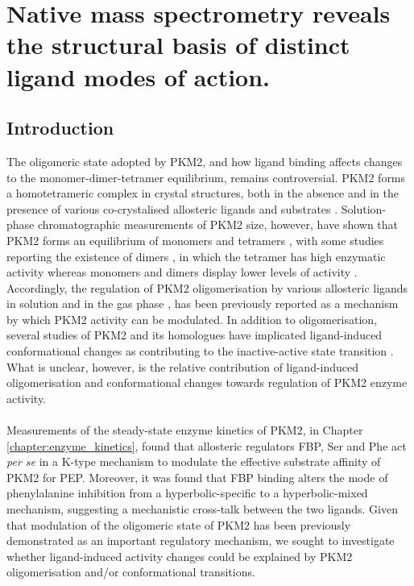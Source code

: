 \chapter{Native mass spectrometry reveals the structural basis of distinct ligand modes of action.}
\label{chapter:mass_spec}

\section{Introduction}
The oligomeric state adopted by PKM2, and how ligand binding affects changes to the monomer-dimer-tetramer equilibrium, remains controversial. PKM2 forms a homotetrameric complex in crystal structures, both in the absence and in the presence of various co-crystalised allosteric ligands and substrates \cite{Anastasiou:2012aa,Chaneton:2012aa,Christofk:2008aa,Dombrauckas:2005aa,Morgan:2013aa,Yuan:2018aa}. Solution-phase chromatographic measurements of PKM2 size, however, have shown that PKM2 forms an equilibrium of monomers and tetramers \cite{Anastasiou:2012aa,Hofmann:1975aa,Kato:1989aa,Morgan:2013aa,Yuan:2018aa}, with some studies reporting the existence of dimers \cite{Keller:2012aa,Yan:2016aa}, in which the tetramer has high enzymatic activity whereas monomers and dimers display lower levels of activity \cite{Anastasiou:2012aa,Ashizawa:1990aa,Ashizawa:1991aa,Hofmann:1975aa,Mazurek:2011aa}. Accordingly, the regulation of PKM2 oligomerisation by various allosteric ligands in solution \cite{Anastasiou:2012aa,Ashizawa:1990aa,Hofmann:1975aa,Keller:2012aa,Morgan:2013aa,Yan:2016aa,Yuan:2018aa} and in the gas phase \cite{Gavriilidou:2018aa}, has been previously reported as a mechanism by which PKM2 activity can be modulated. In addition to oligomerisation, several studies of PKM2 and its homologues have implicated ligand-induced conformational changes as contributing to the inactive-active state transition \cite{Dombrauckas:2005aa,Gehrig:2017aa,Morgan:2010aa,Morgan:2013aa,Morgan:2014aa,Naithani:2015aa,Yuan:2018aa,Zhong:2017aa}. What is unclear, however, is the relative contribution of ligand-induced oligomerisation and conformational changes towards regulation of PKM2 enzyme activity.  
%
%
\\\\
%
%
Measurements of the steady-state enzyme kinetics of PKM2, in Chapter \ref{chapter:enzyme_kinetics}, found that allosteric regulators FBP, Ser and Phe act \textit{per se} in a K-type mechanism to modulate the effective substrate affinity of PKM2 for PEP. Moreover, it was found that FBP binding alters the mode of phenylalanine inhibition from a hyperbolic-specific to a hyperbolic-mixed mechanism, suggesting a mechanistic cross-talk between the two ligands. Given that modulation of the oligomeric state of PKM2 has been previously demonstrated as an important regulatory mechanism, we sought to investigate whether ligand-induced activity changes could be explained by PKM2 oligomerisation and/or conformational transitions. 
